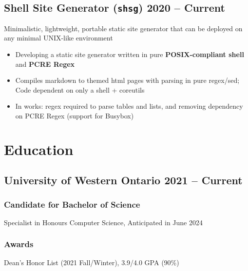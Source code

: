 \documentclass[9pt]{article}
\begin{document}
\subsection{Shell Site Generator (\texttt{shsg}) \hfill \normalsize\textnormal{2020 -- Current}}
    Minimalistic, lightweight, portable static site generator that can be deployed on any minimal UNIX-like environment
\vspace{-0.5em}
\begin{itemize}
  \item Developing a static site generator written in pure \textbf{POSIX-compliant shell} and \textbf{PCRE Regex}
    \item Compiles markdown to themed html pages with parsing in pure regex/sed; Code dependent on only a shell + coreutils 
    \item In works: regex required to parse tables and lists, and removing dependency on PCRE Regex (support for Busybox)
\end{itemize}

\section{Education}
\subsection{University of Western Ontario \hfill \normalsize\textnormal{2021 -- Current}}
\subsubsection{Candidate for Bachelor of Science} Specialist in Honours Computer Science, Anticipated in June 2024

\subsubsection{Awards} Dean's Honor List (2021 Fall/Winter), 3.9/4.0 GPA (90\%)
\end{document}
